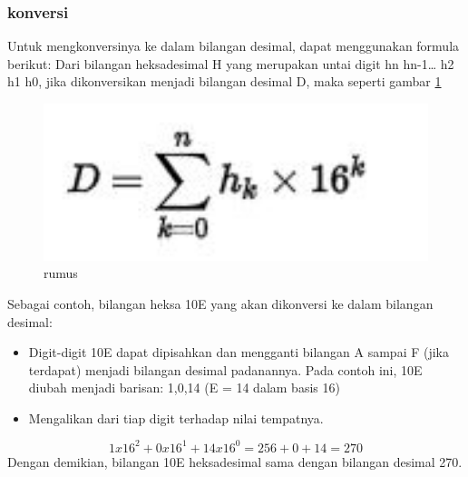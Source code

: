 \subsubsection{konversi}
Untuk mengkonversinya ke dalam bilangan desimal, dapat menggunakan formula berikut:
Dari bilangan heksadesimal H yang merupakan untai digit hn hn-1… h2 h1 h0, jika dikonversikan menjadi bilangan desimal D, maka seperti gambar \ref{rumus}
\begin{figure}[ht]
	\centerline{\includegraphics[width=1\textwidth]{figures/rumus.JPG}}
	\caption{rumus}
	\label{rumus}
	\end{figure}
Sebagai contoh, bilangan heksa 10E yang akan dikonversi ke dalam bilangan desimal:
\begin{itemize}
\item Digit-digit 10E dapat dipisahkan dan mengganti bilangan A sampai F (jika terdapat) menjadi bilangan desimal padanannya. Pada contoh ini, 10E diubah menjadi barisan: 1,0,14 (E = 14 dalam basis 16)
\item Mengalikan dari tiap digit terhadap nilai tempatnya.
\end{itemize}
\begin{equation}
1 x 16^2 + 0 x 16^1 + 14 x 16^0
= 256 + 0 + 14
= 270
\end{equation}
Dengan demikian, bilangan 10E heksadesimal sama dengan bilangan desimal 270.


